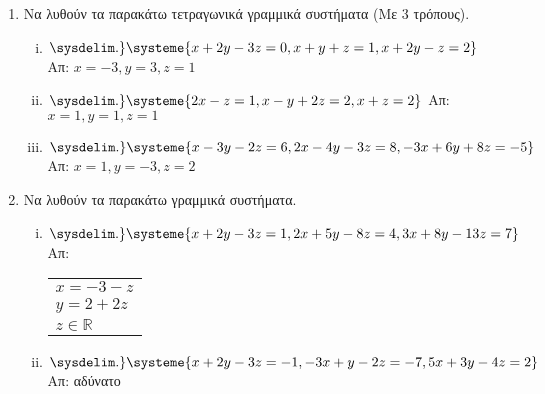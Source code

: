 


\usepackage{systeme}

\pagestyle{askhseis}


\setlength{\itemsep}{\baselineskip}


\begin{center}
  \minibox{\large \bfseries \textcolor{Col1}{Ασκήσεις στα Γραμμικά Συστήματα}}
\end{center}

\vspace{\baselineskip}


\begin{enumerate}
  \item Να λυθούν τα παρακάτω τετραγωνικά γραμμικά συστήματα (Με 3 τρόπους).

    \begin{enumerate}[i)]
      \item $ 
      \sysdelim.\}
      \systeme{x + 2y - 3z = 0,
        x + y + z =1,
      x + 2y - z = 2} $ 
      \hfill Απ: $ x=-3, y=3, z=1 $ 

    \item $ 
    \sysdelim.\}
    \systeme{2x-z=1,x-y+2z=2,x+z=2} $ 
    \hfill Απ: $ x=1, y=1, z=1 $ 

  \item $ 
  \sysdelim.\}
  \systeme{
    x-3y-2z=6,
    2x-4y-3z=8,
    -3x+6y+8z=-5
  } $ 
  \hfill Απ: $ x=1, y=-3, z=2 $ 

\end{enumerate}

\item Να λυθούν τα παρακάτω γραμμικά συστήματα.

  \begin{enumerate}[i)]
    \item $ 
    \sysdelim.\}
    \systeme{
      x+2y-3z=1,
      2x+5y-8z=4,
      3x+8y-13z=7
    } $ 
    \hfill Απ: \begin{tabular}{l}  
      $x=-3-z $ \\ 
      $ y=2+2z $ \\
      $z \in \mathbb{R}  $
    \end{tabular}

  \item $ 
  \sysdelim.\}
  \systeme{
    x+2y-3z=-1,
    -3x+y-2z=-7,
    5x+3y-4z=2
  } $ 
  \hfill Απ: αδύνατο 
\end{enumerate}


\end{enumerate}
